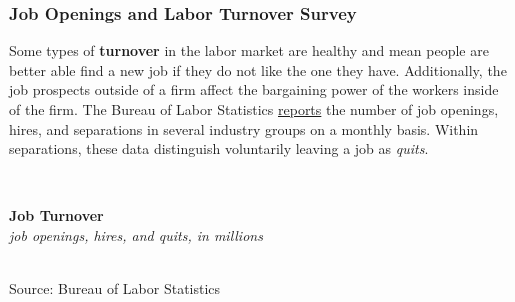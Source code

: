 \documentclass{report}
\makeatletter
\newcommand{\tbllink}[1]{\href{https://raw.githubusercontent.com/bdecon/US-chartbook/master/chartbook/data/#1}{\faTable}}
\newcommand*\short[1]{\expandafter\@gobbletwo\number\numexpr#1\relax}
\newcommand{\stdnode}[3]{\node[below, align=left, shift=({#1,#2})]{#3};}
\newcommand{\dateaxisticks}{
		date coordinates in=x, axis line style={draw=none},
		xmax={2020-05-10},
		max space between ticks=40,	    
		xtick={{1990-01-01}, {1992-01-01}, {1994-01-01}, 
			{1996-01-01}, {1998-01-01}, {2000-01-01}, 
			{2002-01-01}, {2004-01-01}, {2006-01-01},
			{2008-01-01}, {2010-01-01}, {2012-01-01}, {2014-01-01},
		    {2016-01-01}, {2018-01-01}, {2020-01-01}},
		minor xtick={{1989-01-01}, {1991-01-01}, {1993-01-01},
			{1995-01-01}, {1997-01-01}, {1999-01-01}, 
			{2001-01-01}, {2003-01-01}, {2005-01-01}, {2007-01-01},
		    {2009-01-01}, {2011-01-01}, {2013-01-01}, {2015-01-01},
		    {2017-01-01}, {2019-01-01}},
		enlarge y limits={0.06}, enlarge x limits={0.01},
		}
\newcommand{\bbar}[2]{extra #1 ticks = {{#2}}, extra #1 tick labels = ,
		extra #1 tick style = {grid=major, grid style={thick, black!25}},}
\newcommand{\stdline}[4]{\addplot[very thick, no markers, color=#1] 
		table [x=#2, y=#3, col sep=comma] {#4};	}
\newcommand{\rbars}{
		\fill[color=black!10] (axis cs:{1990-07-01},\pgfkeysvalueof{/pgfplots/ymin}) rectangle 
			(axis cs:{1991-03-01}, \pgfkeysvalueof{/pgfplots/ymax});
		\fill[color=black!10] (axis cs:{2007-12-01},\pgfkeysvalueof{/pgfplots/ymin}) rectangle 
			(axis cs:{2009-07-01}, \pgfkeysvalueof{/pgfplots/ymax});
		\fill[color=black!10] (axis cs:{2001-03-01},\pgfkeysvalueof{/pgfplots/ymin}) rectangle 
			(axis cs:{2001-11-01}, \pgfkeysvalueof{/pgfplots/ymax});}
\makeatother
\begin{document}
{{{{{{{{{\newpage

\subsubsection*{\color{black!70} \seriffont Job Openings and Labor Turnover Survey}
\begin{minipage}{0.76\textwidth}
\small Some types of \textbf{turnover} in the labor market are healthy and mean people are better able find a new job if they do not like the one they have. Additionally, the job prospects outside of a firm affect the bargaining power of the workers inside of the firm. The Bureau of Labor Statistics \href{https://www.bls.gov/news.release/pdf/jolts.pdf}{reports} the number of job openings, hires, and separations in several industry groups on a monthly basis. Within separations, these data distinguish voluntarily leaving a job as \textit{quits}. 
\end{minipage}\\

\begin{minipage}{0.28\textwidth}
\small 
\end{minipage} \hspace{4.5mm}
\begin{minipage}{0.437\textwidth}
\noindent \normalsize \textbf{Job Turnover}\\
\footnotesize{\textit{job openings, hires, and quits, in millions}}\\
\noindent \hspace*{-2mm} \\
\footnotesize{Source: Bureau of Labor Statistics} \hfill \tbllink{jolts.csv}
\end{minipage}
\vspace{1mm}

}}}}}}}}}
\end{document}
